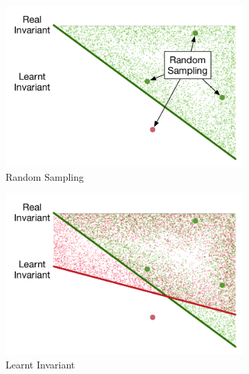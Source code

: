 \begin{figure}[t]
    \centering
    \begin{subfigure}{0.23\textwidth}
        \centering
        \includegraphics[scale=0.3]{figures/general-sampling-0.pdf}
        \caption{Random Sampling}
        \label{fig:sampling:random}
    \end{subfigure}
    \begin{subfigure}{0.23\textwidth}
        \centering
        \includegraphics[scale=0.3]{figures/general-sampling-1.pdf}
        \caption{Learnt Invariant}
        \label{fig:sampling:random:invariant}
    \end{subfigure}
    \begin{subfigure}{0.23\textwidth}
        \centering

\end{subfigure}
\end{figure}
